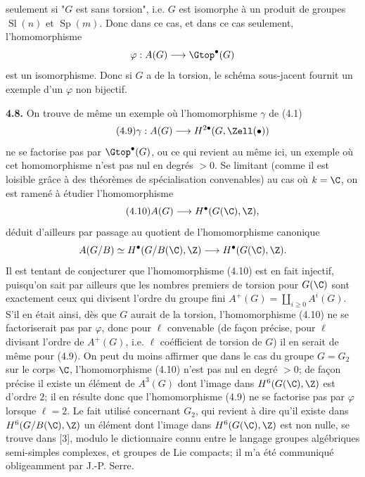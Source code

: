 seulement si "$G$ est sans torsion", i.e. $G$ est isomorphe à un produit de groupes $\operatorname{Sl}(n)$ et $\operatorname{Sp}(m)$. Donc dans ce cas, et dans ce cas seulement, l'homomorphisme
\[
 \varphi:A(G)\longrightarrow\Gtop^\bullet(G)
\]
est un isomorphisme. Donc si $G$ a de la torsion, le schéma sous-jacent fournit un exemple d'un $\varphi$ non bijectif.

\textbf{4.8.} On trouve de même un exemple où l'homomorphisme $\gamma$ de (4.1)
\begin{equation}\tag{4.9}
 \gamma:A(G)\longrightarrow H^{2\bullet}(G,\Zell(\bullet))
\end{equation}
ne se factorise pas par $\Gtop^\bullet(G)$, ou ce qui revient au même ici, un exemple où cet homomorphisme n'est pas nul en degrés $>0$. Se limitant (comme il est loisible grâce à des théorèmes de spécialisation convenables) au cas où $k=\C$, on est ramené à étudier l'homomorphisme
\begin{equation}\tag{4.10}
 A(G)\longrightarrow H^\bullet(G(\C),\Z),
\end{equation}
déduit d'ailleurs par passage au quotient de l'homomorphisme canonique
\[
 A(G/B)\simeq H^\bullet(G/B(\C),\Z)\longrightarrow H^\bullet(G(\C),\Z).
\]
Il est tentant de conjecturer que l'homomorphisme (4.10) est en fait injectif, puisqu'on sait par ailleurs que les nombres premiers de torsion pour $G(\C)$ sont exactement ceux qui divisent l'ordre du groupe fini $A^+(G)=\coprod_{i\geq0}A^i(G)$. S'il en était ainsi, dès que $G$ aurait de la torsion, l'homomorphisme (4.10) ne se factoriserait pas par $\varphi$, donc pour $\ell$ convenable (de façon précise, pour $\ell$ divisant l'ordre de $A^+(G)$, i.e. $\ell$ coéfficient de torsion de $G$) il en serait de même pour (4.9). On peut du moins affirmer que dans le cas du groupe $G=G_2$ sur le corps $\C$, l'homomorphisme (4.10) n'est pas nul en degré $>0$; de façon précise il existe un élément de $A^3(G)$ dont l'image dans $H^6(G(\C),\Z)$ est d'ordre $2$; il en résulte donc que l'homomorphisme (4.9) ne se factorise pas par $\varphi$ lorsque $\ell=2$. Le fait utilisé concernant $G_2$, qui revient à dire qu'il existe dans $H^6(G/B(\C),\Z)$ un élément dont l'image dans $H^6(G(\C),\Z)$ est non nulle, se trouve dans [3], modulo le dictionnaire connu entre le langage groupes algébriques semi-simples complexes, et groupes de Lie compacts; il m'a été communiqué obligeamment par J.-P. Serre.

